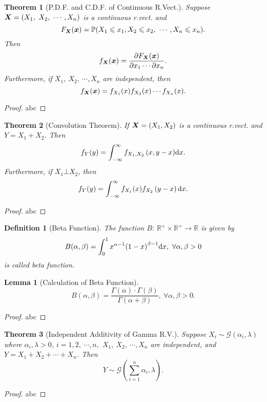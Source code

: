 \documentclass[openany,12pt]{book}
\newtheorem{theorem}{Theorem}[chapter]
\newtheorem{lemma}{Lemma}[chapter]
\newtheorem{definition}{Definition}[chapter]
\begin{document}
\begin{theorem}[P.D.F. and C.D.F. of Continuous R.Vect.]
Suppose $\mX=(X_1,\ X_2,\ \cdots,X_n)$ is a continuous r.vect. and 
$$
F_{\mX}(\mx)=\mathbb{P}(X_1\ls x_1,X_2\ls x_2,\ \cdots,X_n\ls x_n).
$$
Then
$$
f_{\bm{X}}(\bm{x})=\frac{\partial F_{\bm{X}}(\bm{x})}{\partial x_1\cdots\partial x_n}.
$$
Furthermore, if $X_1,\ X_2,\ \cdots,X_n$ are independent, then
$$
f_{\bm{X}}(\bm{x})=f_{X_1}(x)f_{X_2}(x)\cdots f_{X_n}(x).
$$
\end{theorem}

\begin{proof}
  abc
\end{proof}

\begin{theorem}[Convolution Theorem]
If $\bm{X}=(X_1,X_2)$ is a continuous r.vect. and $Y=X_1+X_2$. Then
$$
f_Y(y)=\int_{-\infty}^{\infty}{f_{X_1,X_2}\left(x,y-x\right)}\mathrm{d} x.
$$
Furthermore, if $X_1\bot X_2$, then
$$
f_Y(y)=\int_{-\infty}^{\infty}{f_{X_1}(x)}f_{X_2}\left(y-x\right)\mathrm{d} x.
$$
\end{theorem}

\begin{proof}
  abc
\end{proof}

\begin{definition}[Beta Function]
The function $B:\ \mathbb{R}^+\times\mathbb{R}^+\to\mathbb{R}$ is given by
$$
B(\alpha,\beta)=\int_{0}^{1}x^{\alpha-1}{(1-x)}^{\beta-1}\mathrm{d} x,\ \forall\alpha,\beta>0
$$
is called beta function.
\end{definition}

\begin{lemma}[Calculation of Beta Function]
\[B(\alpha,\beta) = \frac{\Gamma( \alpha ) \cdot \Gamma( \beta )}{\Gamma( \alpha + \beta)},\ \forall\alpha,\beta > 0.\]
\end{lemma}

\begin{proof}
  abc
\end{proof}

\begin{theorem}[Independent Additivity of Gamma R.V.]
Suppose $X_i\sim\mathcal{G}(\alpha_i,\lambda)$ where $\alpha_i,\lambda>0$, $i=1,2,\ \cdots,n,$ ${X}_1,\ X_2,\ \cdots,X_n$ are independent, and $Y=X_1+X_2+\cdots+X_n$. Then
\[Y\sim\mathcal{G}\left( \sum_{i = 1}^{n}\alpha_{i},\lambda \right).\]
\end{theorem}

\begin{proof}
  abc
\end{proof}
\end{document}
